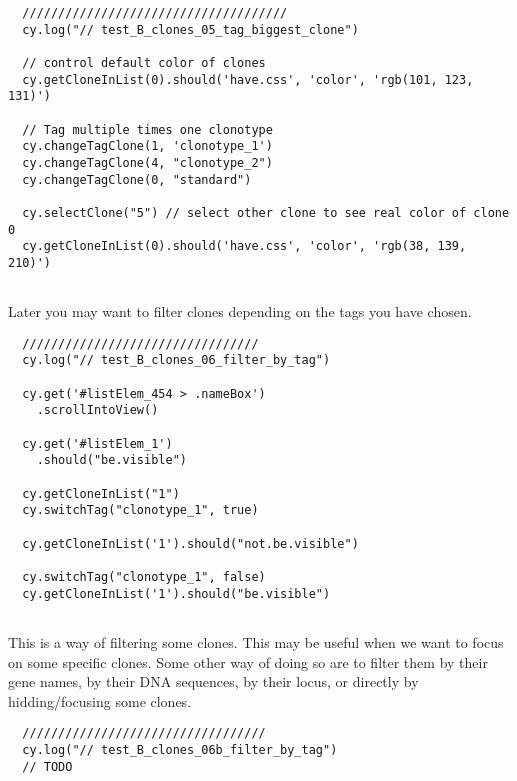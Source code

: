 \begin{verbatim}
  /////////////////////////////////////
  cy.log("// test_B_clones_05_tag_biggest_clone")

  // control default color of clones
  cy.getCloneInList(0).should('have.css', 'color', 'rgb(101, 123, 131)')

  // Tag multiple times one clonotype
  cy.changeTagClone(1, 'clonotype_1')
  cy.changeTagClone(4, "clonotype_2")
  cy.changeTagClone(0, "standard")

  cy.selectClone("5") // select other clone to see real color of clone 0
  cy.getCloneInList(0).should('have.css', 'color', 'rgb(38, 139, 210)')


\end{verbatim}

Later you may want to filter clones depending on the tags you have chosen.


\begin{verbatim}
  /////////////////////////////////
  cy.log("// test_B_clones_06_filter_by_tag")

  cy.get('#listElem_454 > .nameBox')
    .scrollIntoView()

  cy.get('#listElem_1')
    .should("be.visible")

  cy.getCloneInList("1")
  cy.switchTag("clonotype_1", true)

  cy.getCloneInList('1').should("not.be.visible")

  cy.switchTag("clonotype_1", false)
  cy.getCloneInList('1').should("be.visible")


\end{verbatim}

This is a way of filtering some clones. This may be useful when we want to
focus on some specific clones. Some other way of doing so are to filter them by
their gene names, by their DNA sequences, 
by their locus,
or directly by hidding/focusing some clones.


\begin{verbatim}
  //////////////////////////////////
  cy.log("// test_B_clones_06b_filter_by_tag")
  // TODO

\end{verbatim}

